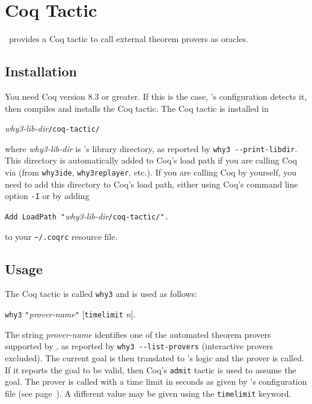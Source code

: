 \chapter{Coq Tactic}
\label{chap:tactic}

\why\ provides a Coq tactic to call external theorem provers as oracles.

\section{Installation}

You need Coq version 8.3 or greater. If this is the case, \why's
configuration detects it, then compiles and installs the Coq tactic.
The Coq tactic is installed in
\begin{center}
  \textit{why3-lib-dir}\texttt{/coq-tactic/}
\end{center}
where \textit{why3-lib-dir} is \why's library directory, as reported
by \verb+why3 --print-libdir+. This directory
is automatically added to Coq's load path if you are
calling Coq via \why (from \texttt{why3ide}, \texttt{why3replayer},
etc.). If you are calling Coq by yourself, you need to add
this directory to Coq's load path, either using Coq's command line
option \texttt{-I} or by adding
\begin{center}
  \verb+Add LoadPath "+\textit{why3-lib-dir}\verb+/coq-tactic/".+
\end{center}
to your \texttt{\~{}/.coqrc} resource file.

\section{Usage}

The Coq tactic is called \texttt{why3} and is used as follows:
\begin{center}
  \texttt{why3} \verb+"+\textit{prover-name}\verb+"+
  $[$\texttt{timelimit} \textit{n}$]$.
\end{center}
The string \textit{prover-name} identifies one of the automated theorem provers
supported by \why, as reported by \verb+why3 --list-provers+
(interactive provers excluded).
The current goal is then translated to \why's logic and the prover is
called. If it reports the goal to be valid, then Coq's \texttt{admit}
tactic is used to assume the goal. The prover is called with a time
limit in seconds as given by \why's configuration file
(see page~\pageref{sec:whyconffile}). A different value may be given
using the \texttt{timelimit} keyword.

